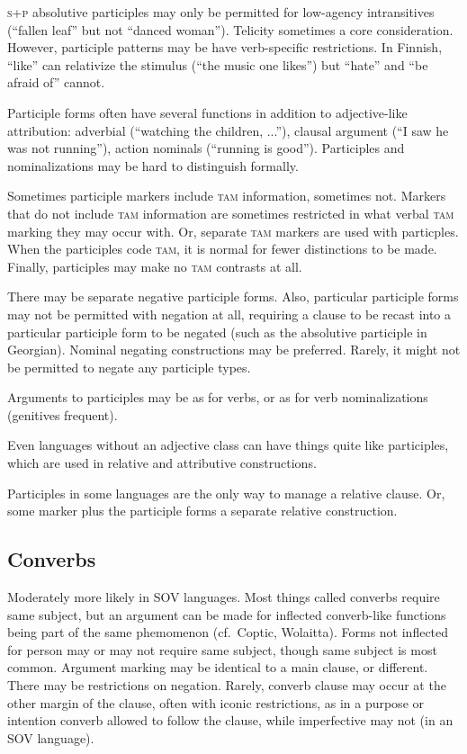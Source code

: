 \documentclass[11pt]{article}
\newcommand{\I}[1]{\textsc{#1}}   %
\begin{document}
{\I{s+p} absolutive participles may only be permitted for low-agency
intransitives (``fallen leaf'' but not ``danced woman'').  Telicity
sometimes a core consideration.  However, participle patterns may be
have verb-specific restrictions.  In Finnish, ``like'' can relativize
the stimulus (``the music one likes'') but ``hate'' and ``be afraid
of'' cannot.

Participle forms often have several functions in addition to
adjective-like attribution: adverbial (``watching the children,
...''), clausal argument (``I saw he was not running''), action
nominals (``running is good'').  Participles and nominalizations may
be hard to distinguish formally.

Sometimes participle markers include \I{tam} information, sometimes
not.  Markers that do not include \I{tam} information are sometimes
restricted in what verbal \I{tam} marking they may occur with.  Or,
separate \I{tam} markers are used with particples.  When the
participles code \I{tam}, it is normal for fewer distinctions to be
made.  Finally, participles may make no \I{tam} contrasts at all.

There may be separate negative participle forms.  Also, particular
participle forms may not be permitted with negation at all, requiring
a clause to be recast into a particular participle form to be negated
(such as the absolutive participle in Georgian).  Nominal negating
constructions may be preferred.  Rarely, it might not be permitted to
negate any participle types.

Arguments to participles may be as for verbs, or as for verb
nominalizations (genitives frequent).

Even languages without an adjective class can have things quite like
participles, which are used in relative and attributive constructions. 

Participles in some languages are the only way to manage a relative
clause.  Or, some marker plus the participle forms a separate relative
construction. 


\subsection{Converbs}
Moderately more likely in SOV languages. Most things called converbs
require same subject, but an argument can be made for inflected
converb-like functions being part of the same phemomenon (cf.\ Coptic,
Wolaitta).  Forms not inflected for person may or may not require same
subject, though same subject is most common.  Argument marking may be
identical to a main clause, or different.  There may be restrictions
on negation.  Rarely, converb clause may occur at the other margin of
the clause, often with iconic restrictions, as in a purpose or
intention converb allowed to follow the clause, while imperfective may
not (in an SOV language).

}
\end{document}

